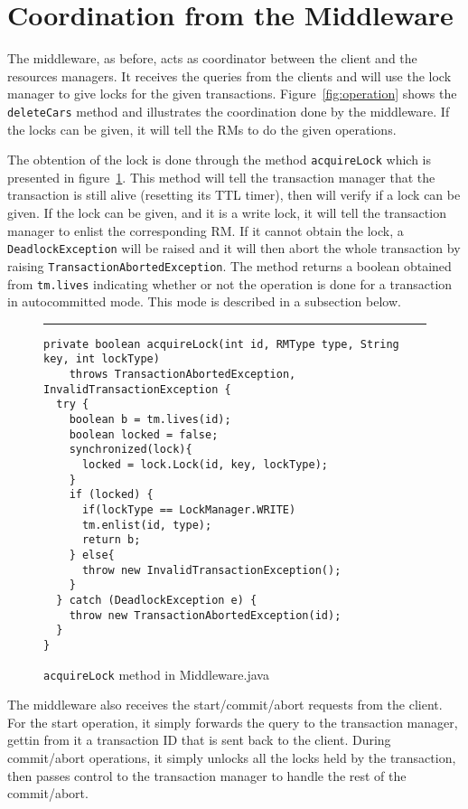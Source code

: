 \documentclass[12pt]{article}
\theoremstyle{plain}%
\theoremstyle{definition}
\theoremstyle{remark}
\newcommand{\java}[1]{{\lstinline!#1!}}
\newenvironment{figureone}[1]{%
  \def\deffigurecaption{#1}%
  \begin{figure}[htbp]%
  \begin{center}%
  \begin{minipage}{\columnwidth}%
  \hrule \vspace*{2ex}%
}{%
  \end{minipage}%
  \end{center}%
  \caption{\deffigurecaption}%
  \end{figure}%
}
\begin{document}
\section{Coordination from the Middleware}

The middleware, as before, acts as coordinator between the client and the resources managers. It receives the queries from the clients and will use the lock manager to give locks for the given transactions. Figure~\ref{fig:operation} shows the \java{deleteCars} method and illustrates the coordination done by the middleware. If the locks can be given, it will tell the RMs to do the given operations. 

The obtention of the lock is done through the method \java{acquireLock} which is presented in figure~\ref{fig:acquireLock}. This method will tell the transaction manager that the transaction is still alive (resetting its TTL timer), then will verify if a lock can be given. If the lock can be given, and it is a write lock, it will tell the transaction manager to enlist the corresponding RM. If it cannot obtain the lock, a \java{DeadlockException} will be raised and it will then abort the whole transaction by raising \java{TransactionAbortedException}. The method returns a boolean obtained from \java{tm.lives} indicating whether or not the operation is done for a transaction in autocommitted mode. This mode is described in a subsection below.

\begin{figureone}{\java{acquireLock} method in Middleware.java \label{fig:acquireLock}}
\begin{lstlisting}
private boolean acquireLock(int id, RMType type, String key, int lockType) 
    throws TransactionAbortedException, InvalidTransactionException {
  try {
    boolean b = tm.lives(id);
    boolean locked = false;
    synchronized(lock){
      locked = lock.Lock(id, key, lockType);
    }
    if (locked) {
      if(lockType == LockManager.WRITE)
      tm.enlist(id, type);
      return b;
    } else{
      throw new InvalidTransactionException();
    }
  } catch (DeadlockException e) {
    throw new TransactionAbortedException(id);
  }
}
\end{lstlisting}
\end{figureone}

The middleware also receives the start/commit/abort requests from the client. For the start operation, it simply forwards the query to the transaction manager, gettin from it a transaction ID that is sent back to the client. During commit/abort operations, it simply unlocks all the locks held by the transaction, then passes control to the transaction manager to handle the rest of the commit/abort.
\end{document}
